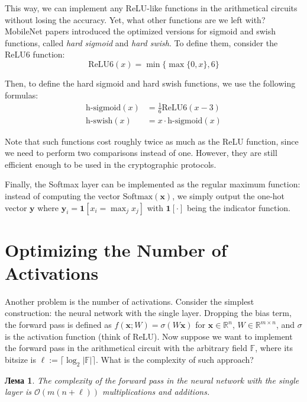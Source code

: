 \documentclass[12pt,a4paper,oneside]{book}
\theoremstyle{dplplain}
\newtheorem{lemma}[theorem]{Лема}%
\theoremstyle{dpldefinition}
\theoremstyle{dplremark}
\begin{document}
This way, we can implement any ReLU-like functions in the arithmetical circuits
without losing the accuracy. Yet, what other functions are we left with?
MobileNet papers \cite{mobilenetv2,mobilenetv3} introduced the optimized
versions for sigmoid and swish functions, called \textit{hard sigmoid} and
\textit{hard swish}. To define them, consider the ReLU6 function:
\begin{equation*}
    \text{ReLU6}(x) = \min\{\max\{0,x\},6\}
\end{equation*}

Then, to define the hard sigmoid and hard swish functions, we use the following
formulas:
\begin{align*}
    \text{h-sigmoid}(x) &= \frac{1}{6}\text{ReLU6}(x-3) \\
    \text{h-swish}(x) &= x \cdot \text{h-sigmoid}(x)
\end{align*}

Note that such functions cost roughly twice as much as the ReLU function, since 
we need to perform two comparisons instead of one. However, they are still
efficient enough to be used in the cryptographic protocols.

Finally, the Softmax layer can be implemented as the regular maximum function:
instead of computing the vector $\textrm{Softmax}(\mathbf{x})$, we simply output
the one-hot vector $\mathbf{y}$ where $\mathbf{y}_i = \mathbf{1}[x_i =
\max_{j}x_j]$ with $\mathbf{1}[\cdot]$ being the indicator function.

\section{Optimizing the Number of Activations}

Another problem is the number of activations. Consider the simplest
construction: the neural network with the single layer. Dropping the bias term,
the forward pass is defined as $f(\mathbf{x}; W) = \sigma(W\mathbf{x})$ for
$\mathbf{x} \in \mathbb{R}^n$, $W \in \mathbb{R}^{m \times n}$, and $\sigma$ is
the activation function (think of ReLU). Now suppose we want to implement the
forward pass in the arithmetical circuit with the arbitrary field $\mathbb{F}$,
where its bitsize is $\ell := \lceil \log_2 |\mathbb{F}| \rceil$. What is the
complexity of such approach?

\begin{lemma}
    The complexity of the forward pass in the neural network with the single
    layer is $\mathcal{O}(m(n+\ell))$ multiplications and
    additions.
\end{lemma}
\end{document}
